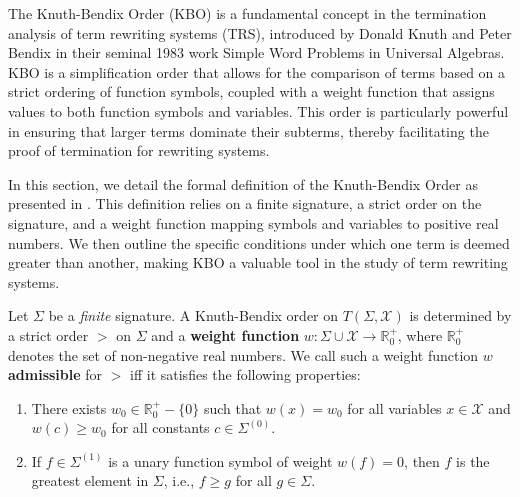     The Knuth-Bendix Order (KBO) is a fundamental concept in the termination analysis of term rewriting systems (TRS), introduced by Donald Knuth and Peter Bendix in their seminal 1983 work Simple Word Problems in Universal Algebras. KBO is a simplification order that allows for the comparison of terms based on a strict ordering of function symbols, coupled with a weight function that assigns values to both function symbols and variables. This order is particularly powerful in ensuring that larger terms dominate their subterms, thereby facilitating the proof of termination for rewriting systems.

    In this section, we detail the formal definition of the Knuth-Bendix Order as presented in \cite{knuth1983simple}. This definition relies on a finite signature, a strict order on the signature, and a weight function mapping symbols and variables to positive real numbers. We then outline the specific conditions under which one term is deemed greater than another, making KBO a valuable tool in the study of term rewriting systems.
  
  \begin{definition}
    
    Let $\Sigma$ be a \textit{finite} signature. A Knuth-Bendix order on $T(\Sigma, \mathcal{X})$ is determined by a strict order $>$ on $\Sigma$ and a \textbf{weight function} $w : \Sigma \mathop{\cup} \mathcal{X} \mathop{\rightarrow} \mathbb{R}^+_0$, where $\mathbb{R}^+_0$ denotes the set of non-negative real numbers. We call such a weight function $w$ \textbf{admissible} for $>$ iff it satisfies the following properties:

\begin{enumerate}
    \item There exists $w_0 \mathop{\in} \mathbb{R}^+_0 - \{0\}$ such that $w(x) \mathop{=} w_0$ for all variables $x \mathop{\in} \mathcal{X}$ and $w(c) \mathop{\geq} w_0$ for all constants $c \mathop{\in} \Sigma^{(0)}$.
    \item If $f \mathop{\in} \Sigma^{(1)}$ is a unary function symbol of weight $w(f) \mathop{=} 0$, then $f$ is the greatest element in $\Sigma$, i.e., $f \mathop{\geq} g$ for all $g \mathop{\in} \Sigma$.
\end{enumerate}
\end{definition}

